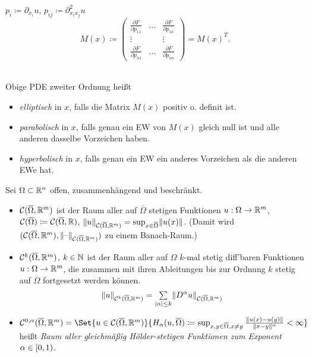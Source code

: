 \documentclass{cheat-sheet}
\newcommand{\Cont}{\mathcal{C}} %
\newcommand{\clos}[1]{\overline{#1}} %
\newcommand{\cOmega}{\clos{\Omega}} %
\begin{document}
\begin{nota}
  $p_i \coloneqq \partial_{x_i} u$, $p_{ij} \coloneqq \partial^2_{x_i x_j} u$
  \[
    M(x) \coloneqq \begin{pmatrix}
      \tfrac{\partial F}{\partial p_{11}} & \hdots & \tfrac{\partial F}{\partial p_{1n}} \\
      \vdots && \vdots \\
      \tfrac{\partial F}{\partial p_{n1}} & \hdots & \tfrac{\partial F}{\partial p_{nn}}
    \end{pmatrix} = M(x)^{T}.
  \]
\end{nota}

\begin{defn}\mbox{}\\
  Obige PDE zweiter Ordnung heißt
  \begin{itemize}
    \item \emph{elliptisch} in $x$, falls die Matrix $M(x)$ positiv o. definit ist.
    \item \emph{parabolisch} in $x$, falls genau ein EW von $M(x)$ gleich null ist und alle anderen dasselbe Vorzeichen haben.
    \item \emph{hyperbolisch} in $x$, falls genau ein EW ein anderes Vorzeichen als die anderen EWe hat.
  \end{itemize}
\end{defn}




\begin{defn}
  Sei $\Omega \subset \mathbb{R}^n$ offen, zusammenhängend und beschränkt.
  \begin{itemize}
    \item $\Cont(\cOmega, \R^m)$ ist der Raum aller auf $\cOmega$ stetigen Funktionen $u : \Omega \to \mathbb{R}^m$, $\Cont(\cOmega) \coloneqq \Cont(\cOmega, \R)$, $\norm{u}_{\Cont(\cOmega, \R^m)} = \sup_{x \in \cOmega} \norm{u(x)}$.
    (Damit wird $(\Cont(\cOmega, \R^m), \norm{\blank}_{\Cont(\cOmega, \R^m)})$ zu einem Banach-Raum.)
    \item $\Cont^k(\cOmega, \R^m)$, $k \in \mathbb{N}$ ist der Raum aller auf $\Omega$ $k$-mal stetig diff'baren Funktionen $u : \Omega \to \mathbb{R}^m$, die zusammen mit ihren Ableitungen bis zur Ordnung $k$ stetig auf $\cOmega$ fortgesetzt werden können.
    \[ \norm{u}_{\Cont^k(\overline{\Omega}, \R^m)} = \sum_{\abs{\alpha} \leq k} \norm{D^\alpha u}_{\Cont(\overline{\Omega}, \R^m)} \]
    \item $\Cont^{0,\alpha}(\cOmega, \R^m) = \Set{u \in \Cont(\cOmega, \R^m)}{H_\alpha(u, \cOmega) \coloneqq \sup_{x, y \in \cOmega, x \neq y} \frac{\norm{u(x)-u(y)}}{\norm{x-y}^\alpha} < \infty}$ heißt \emph{Raum aller gleichmäßig Hölder-stetigen Funktionen zum Exponent $\alpha \in \left[ 0, 1 \right)$}.
  \end{itemize}
\end{defn}
\end{document}
